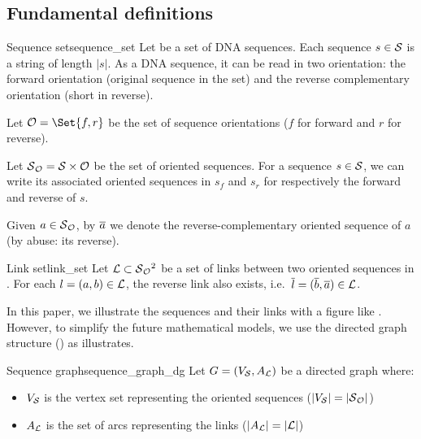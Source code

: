 \subsection{Fundamental definitions}

\begin{definition}{Sequence set}{sequence_set}
  Let \Sequences{} be a set of DNA sequences.
  Each sequence \(s \in \mathcal{S}{}\) is a string of length \(|s|\).
  As a DNA sequence, it can be read in two orientation:
  the forward orientation (original sequence in the set) and the reverse complementary orientation (short in reverse).

  Let \( \Orientations{} = \Set{f, r} \) be the set of sequence orientations (\(f\) for forward and \(r\) for reverse).

  Let \( \mathcal{S}{}_{\mathcal{O}{}}{} = \mathcal{S}{} \times \mathcal{O}{} \) be the set of oriented sequences.
  For a sequence \(s \in \mathcal{S}{}\), we can write its associated oriented sequences in \OrSeqs{} \(s_f\) and \(s_r\) for respectively the forward and reverse of \(s\).

  Given \(a \in \mathcal{S}{}_{\mathcal{O}{}}{}\), by \(\overline{a}\) we denote the reverse-complementary oriented sequence of \(a\) (by abuse: its reverse).
\end{definition}

\begin{definition}{Link set}{link_set}
  Let \(\mathcal{L}{} \subset \mathcal{S}{}_{\mathcal{O}{}}{}^2\) be a set of links between two oriented sequences in \OrSeqs{}.
  For each \(l = (a, b) \in \mathcal{L}{}\), the reverse link also exists, i.e.\ \(\overline{l} = (\overline{b}, \overline{a}) \in \mathcal{L}{} \). %
\end{definition}

In this paper, we illustrate the sequences and their links with a figure like .
However, to simplify the future mathematical models, we use the directed graph structure () as  illustrates.

\begin{definition}{Sequence graph}{sequence_graph_dg}
  Let \(G = (V_{\mathcal{S}{}}, A_{\mathcal{L}{}})\) be a directed graph where:

  \begin{itemize}
    \item \(V_{\mathcal{S}{}}\) is the vertex set representing the oriented sequences (\(|V_{\mathcal{S}{}}| = |\mathcal{S}{}_{\mathcal{O}{}}|\))
    \item \(A_{\mathcal{L}{}}\) is the set of arcs representing the links (\(|A_{\mathcal{L}{}}| = |\mathcal{L}|\))
  \end{itemize}
\end{definition}

